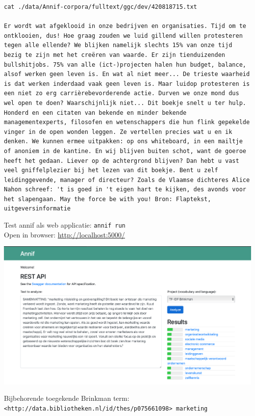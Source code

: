 \documentclass{article}
\begin{document}
\begin{lstlisting}
cat ./data/Annif-corpora/fulltext/ggc/dev/420818715.txt

Er wordt wat afgeklooid in onze bedrijven en organisaties. Tijd om te ontklooien, dus! Hoe graag zouden we luid gillend willen protesteren tegen alle ellende? We blijken namelijk slechts 15% van onze tijd bezig te zijn met het creëren van waarde. Er zijn tienduizenden bullshitjobs. 75% van alle (ict-)projecten halen hun budget, balance, alsof werken geen leven is. En wat al niet meer... De trieste waarheid is dat werken inderdaad vaak geen leven is. Maar luidop protesteren is een niet zo erg carrièrebevorderende actie. Durven we onze mond dus wel open te doen? Waarschijnlijk niet... Dit boekje snelt u ter hulp. Honderd en een citaten van bekende en minder bekende managementexperts, filosofen en wetenschappers die hun flink gepekelde vinger in de open wonden leggen. Ze vertellen precies wat u en ik denken. We kunnen ermee uitpakken: op ons whiteboard, in een mailtje of anoniem in de kantine. En wij blijven buiten schot, want de goeroe heeft het gedaan. Liever op de achtergrond blijven? Dan hebt u vast veel gniffelplezier bij het lezen van dit boekje. Bent u zelf leidinggevende, manager of directeur? Zoals de Vlaamse dichteres Alice Nahon schreef: 't is goed in 't eigen hart te kijken, des avonds voor het slapengaan. May the force be with you! Bron: Flaptekst, uitgeversinformatie
\end{lstlisting}

\noindent
Test annif als web applicatie: \texttt{annif run} \\
Open in browser: \url{http://localhost:5000/}

\noindent
\includegraphics[width=150mm, scale=0.4]{7BBD85895892414FC9DD9978C35B6B14.png}

Bijbehorende toegekende Brinkman term: \\
\texttt{<http://data.bibliotheken.nl/id/thes/p075661098>	marketing}
\end{document}

